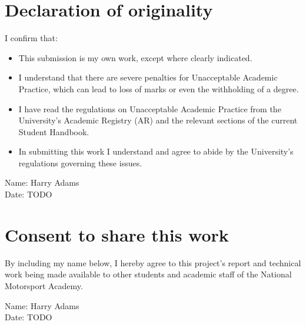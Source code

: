 \thispagestyle{empty}


\section*{\centering Declaration of originality}

I confirm that:

\begin{itemize}
\item{This submission is my own work, except where 
clearly indicated.}

\item{I understand that there are severe penalties for Unacceptable Academic Practice, which can lead to loss of marks or even the withholding of a degree.}
 
\item{I have read the regulations on Unacceptable Academic Practice from the University's Academic Registry (AR) and the relevant sections of the current Student Handbook.}
 
\item{In submitting this work I understand and agree to abide by the University's regulations governing these issues.}
\end{itemize}

\vspace{2em}
Name: Harry Adams  \\

\vspace{1em}
Date: TODO \\

\vspace{1em}
\section*{\centering Consent to share this work}

By including my name below, I hereby agree to this project's report and technical work being made available to other students and academic staff of the National Motorsport Academy.  

\vspace{2em}
Name: Harry Adams  \\

\vspace{1em}
Date: TODO \\


